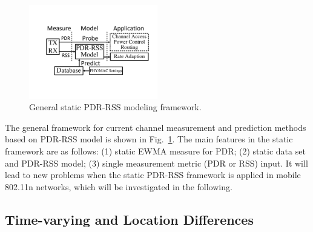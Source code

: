 \documentclass[draftclsnofoot,journal,onecolumn,11pt]{IEEEtran}
\begin{document}
\begin{figure}[!htp]
\centering
\includegraphics[width=0.5\textwidth]{modeling1.pdf}
\caption{General static PDR-RSS modeling framework.}
\label{offlinemodel}
\end{figure}

The general framework for current channel measurement and prediction methods based on PDR-RSS model is shown in Fig.~\ref{offlinemodel}. The main features in the static framework are as follows: (1) static EWMA measure for PDR; (2) static data set and PDR-RSS model; (3) single measurement metric (PDR or RSS) input. It will lead to new problems when the static PDR-RSS framework is applied in mobile 802.11n networks, which will be investigated in the following.


\subsection{Time-varying and Location Differences}
\end{document}
